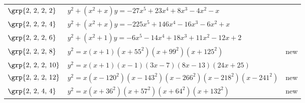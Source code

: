 \begin{longtable}{@{}>{\raggedright\arraybackslash}p{1.35cm}
 >{\raggedright\arraybackslash}p{}
 >{\raggedright\arraybackslash}p{1.1cm}@{}}
$\grp{2,\,2,\,2,\,2}$ & \href{https://alpha.lmfdb.org/Genus2Curve/Q/?jump=[[0,-1,-4,8,23,-27],[0,1,1]]}{$y^2 + (x^{2}+x)y = -27x^{5}+23x^{4}+8x^{3}-4x^{2}-x$} & \cite{BookerSutherland}\\
$\grp{2,\,2,\,2,\,4}$ & \href{https://alpha.lmfdb.org/Genus2Curve/Q/?jump=[[0,1,-6,-16,146,-225],[0,1,1]]}{$y^2 + (x^{2}+x)y = -225x^{5}+146x^{4}-16x^{3}-6x^{2}+x$} & \cite{BookerSutherland}\\
$\grp{2,\,2,\,2,\,6}$ & \href{https://alpha.lmfdb.org/Genus2Curve/Q/?jump=[[2,-12,11,18,-14,-6],[1,0,1]]}{$y^2 + (x^{2}+1)y = -6x^{5}-14x^{4}+18x^{3}+11x^{2}-12x+2$} & \cite{BookerSutherland}\\
$\grp{2,\,2,\,2,\,8}$ & $y^2 = x(x+1)(x+55^2)(x+99^2)(x+125^2)$ & new\\
$\grp{2,\,2,\,2,\,10}$ & $y^2 = x(x+1)(x-1)(3x-7)(8x-13)(24x+25)$ & \cite{Elkies2024}\\
$\grp{2,\,2,\,2,\,12}$ & $y^2 = x(x-120^2)(x-143^2)(x-266^2)(x-218^2)(x-241^2)$ & new\\
$\grp{2,\,2,\,4,\,4}$ & $y^2 = x(x+36^2)(x+57^2)(x+64^2)(x+132^2)$ & new\\
\end{longtable}
\endgroup
